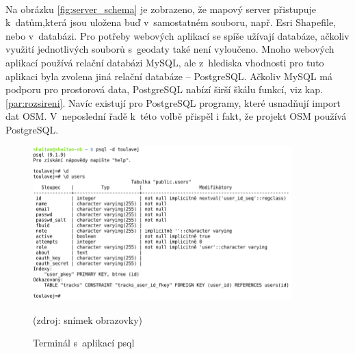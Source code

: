 \documentclass[11pt,a4paper,titlepage,oneside]{book}
\begin{document}
		\paragraph{} Na obrázku \ref{fig:server_schema} je zobrazeno, že mapový server přistupuje k~datům,která jsou uložena buď v~samostatném souboru, např. Esri Shapefile, nebo v~databázi. Pro potřeby webových aplikací se spíše užívají databáze, ačkoliv využití jednotlivých souborů s~geodaty také není vyloučeno. Mnoho webových aplikací používá relační databázi MySQL, ale z~hlediska vhodnosti pro tuto aplikaci byla zvolena jiná relační databáze -- PostgreSQL. Ačkoliv MySQL má podporu pro prostorová data, PostgreSQL nabízí širší škálu funkcí, viz kap. \ref{par:rozsireni}. Navíc existují pro PostgreSQL programy, které usnadňují import dat \ac{OSM}. V~neposlední řadě k~této volbě přispěl i fakt, že projekt \ac{OSM} používá PostgreSQL.
		\begin{figure}[!h]
			\begin{center}
				\includegraphics[width=10cm]{obrazky/psql.png}
				\caption{Terminál s~aplikací psql}
				\label{fig:psql}
				(zdroj: snímek obrazovky)
			\end{center}
		\end{figure}



\end{document}
